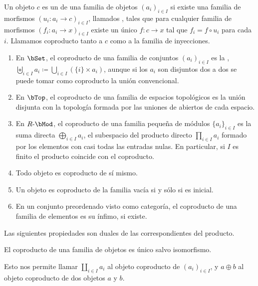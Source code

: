 \begin{definition}
  Un objeto $c$ es un  de una familia de objetos
  $(a_i)_{i\in I}$ si existe una familia de morfismos $(u_i:a_i\to c)_{i\in I}$,
  llamados , tales que para cualquier familia de morfismos
  $(f_i:a_i\to x)_{i\in I}$ existe un único $f:c\to x$ tal que $f_i=f\circ u_i$
  para cada $i$. Llamamos coproducto tanto a $c$ como a la familia de
  inyecciones.
\end{definition}

\begin{example}\;
  \begin{enumerate}
  \item En $\bSet$, el coproducto de una familia de conjuntos $(a_i)_{i\in I}$
    es la ,
    $\biguplus_{i\in I}a_i\coloneqq\bigcup_{i\in I}(\{i\}\times a_i)$, aunque si
    los $a_i$ son disjuntos dos a dos se puede tomar como coproducto la unión
    convencional.
  \item En $\bTop$, el coproducto de una familia de espacios topológicos es la
    unión disjunta con la topología formada por las uniones de abiertos de cada
    espacio.
  \item En $R\dash\bMod$, el coproducto de una familia pequeña de módulos
    $\{a_i\}_{i\in I}$ es la suma directa $\bigoplus_{i\in I}a_i$, el subespacio
    del producto directo $\prod_{i\in I}a_i$ formado por los elementos con casi
    todas las entradas nulas. En particular, si $I$ es finito el producto
    coincide con el coproducto.
  \item Todo objeto es coproducto de sí mismo.
  \item Un objeto es coproducto de la familia vacía si y sólo si es inicial.
  \item En un conjunto preordenado visto como categoría, el coproducto de una
    familia de elementos es su ínfimo, si existe.
  \end{enumerate}  
\end{example}

Las siguientes propiedades son duales de las correspondientes del producto.

\begin{proposition}
  El coproducto  de una familia de objetos es único salvo isomorfismo.
\end{proposition}

Esto nos permite llamar $\coprod_{i\in I}a_i$ al objeto coproducto de
$(a_i)_{i\in I}$, y $a\oplus b$ al objeto coproducto de dos objetos $a$ y $b$.

